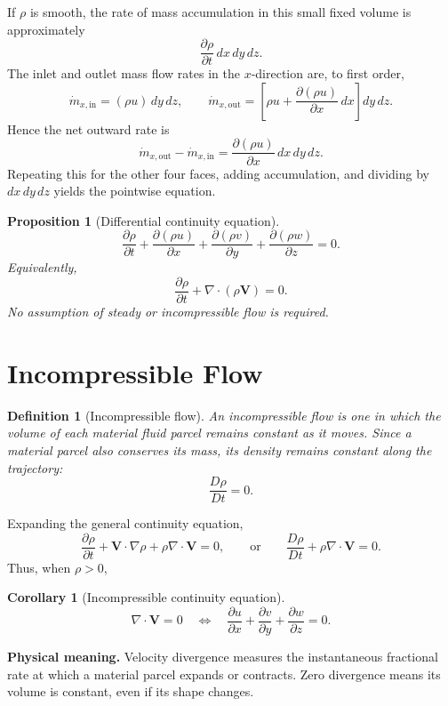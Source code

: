 \documentclass[11pt]{article}
\theoremstyle{plaincolon}
\newtheorem{proposition}[theorem]{Proposition}
\newtheorem{corollary}[theorem]{Corollary}
\theoremstyle{definitioncolon}
\newtheorem{definition}[theorem]{Definition}
\theoremstyle{remarkcolon}
\numberwithin{equation}{section}
\begin{document}
If $\rho$ is smooth, the rate of mass accumulation in this small fixed volume is approximately
\[
\frac{\partial\rho}{\partial t}\,dx\,dy\,dz.
\]
The inlet and outlet mass flow rates in the $x$-direction are, to first order,
\[
\dot m_{x,\mathrm{in}}=(\rho u)\,dy\,dz,\qquad
\dot m_{x,\mathrm{out}}=\left[\rho u+\frac{\partial(\rho u)}{\partial x}\,dx\right]dy\,dz.
\]
Hence the net outward rate is
\[
\dot m_{x,\mathrm{out}}-\dot m_{x,\mathrm{in}}
=\frac{\partial(\rho u)}{\partial x}\,dx\,dy\,dz.
\]
Repeating this for the other four faces, adding accumulation, and dividing by $dx\,dy\,dz$ yields the pointwise equation.

\begin{proposition}[Differential continuity equation]
\[
\frac{\partial\rho}{\partial t}
+\frac{\partial(\rho u)}{\partial x}
+\frac{\partial(\rho v)}{\partial y}
+\frac{\partial(\rho w)}{\partial z}=0.
\]
Equivalently,
\[
\frac{\partial\rho}{\partial t}+\nabla\cdot(\rho\mathbf V)=0.
\]
No assumption of steady or incompressible flow is required.
\end{proposition}

\section{Incompressible Flow}

\begin{definition}[Incompressible flow]
An incompressible flow is one in which the volume of each material fluid parcel remains constant as it moves. Since a material parcel also conserves its mass, its density remains constant along the trajectory:
\[
\frac{D\rho}{Dt}=0.
\]
\end{definition}

Expanding the general continuity equation,
\[
\frac{\partial\rho}{\partial t}
+\mathbf V\cdot\nabla\rho+\rho\nabla\cdot\mathbf V=0,
\qquad\text{or}\qquad
\frac{D\rho}{Dt}+\rho\nabla\cdot\mathbf V=0.
\]
Thus, when $\rho>0$,

\begin{corollary}[Incompressible continuity equation]
\[
\nabla\cdot\mathbf V=0
\quad\Longleftrightarrow\quad
\frac{\partial u}{\partial x}+
\frac{\partial v}{\partial y}+
\frac{\partial w}{\partial z}=0.
\]
\end{corollary}

\textbf{Physical meaning.} Velocity divergence measures the instantaneous fractional rate at which a material parcel expands or contracts. Zero divergence means its volume is constant, even if its shape changes.
\end{document}
